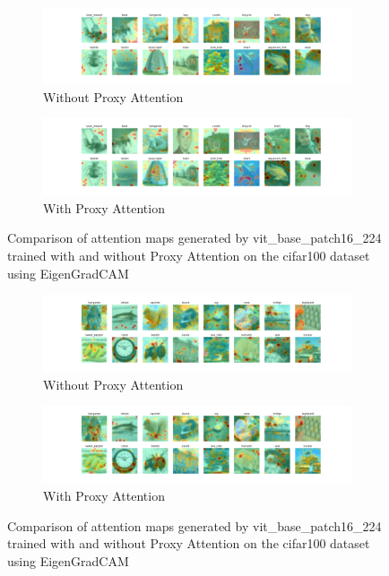 \documentclass[a4paper,11pt,openright]{book}
\begin{document}
\begin{figure}[!htb]
    \centering
    \begin{subfigure}[b]{1\textwidth}
        \includegraphics[width=\textwidth]{images/gpp_cifar100_vit_base_patch16_224_noproxy_1.pdf}
        \caption{Without Proxy Attention}
    \end{subfigure}
    \hfill
    \begin{subfigure}[b]{1\textwidth}
        \includegraphics[width=\textwidth]{images/gpp_cifar100_vit_base_patch16_224_proxy_1.pdf}
        \caption{With Proxy Attention}
    \end{subfigure}
    \caption{Comparison of attention maps generated by vit\_base\_patch16\_224 trained with and without Proxy Attention on the cifar100 dataset using EigenGradCAM}
\end{figure}


\begin{figure}[!htb]
    \centering
    \begin{subfigure}[b]{1\textwidth}
        \includegraphics[width=\textwidth]{images/gpp_cifar100_vit_base_patch16_224_noproxy_2.pdf}
        \caption{Without Proxy Attention}
    \end{subfigure}
    \hfill
    \begin{subfigure}[b]{1\textwidth}
        \includegraphics[width=\textwidth]{images/gpp_cifar100_vit_base_patch16_224_proxy_2.pdf}
        \caption{With Proxy Attention}
    \end{subfigure}
    \caption{Comparison of attention maps generated by vit\_base\_patch16\_224 trained with and without Proxy Attention on the cifar100 dataset using EigenGradCAM}
\end{figure}
\end{document}
